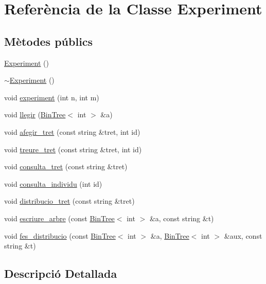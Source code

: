 \hypertarget{class_experiment}{}\section{Referència de la Classe Experiment}
\label{class_experiment}
\subsection*{Mètodes públics}
\begin{DoxyCompactItemize}
\item 
\hyperlink{class_experiment_a303e6a05d99f403ff4793495a2fbff58}{Experiment} ()
\item 
\hyperlink{class_experiment_a96058d848040e45948bbb60623711da6}{$\sim$\+Experiment} ()
\item 
void \hyperlink{class_experiment_a63c86bd1da616ca6e6a1062927365c20}{experiment} (int n, int m)
\item 
void \hyperlink{class_experiment_a54749c1c7a945548ec6e899222b03f98}{llegir} (\hyperlink{class_bin_tree}{Bin\+Tree}$<$ int $>$ \&a)
\item 
void \hyperlink{class_experiment_a66622c82700376f3aa3f6695650a63fe}{afegir\+\_\+tret} (const string \&tret, int id)
\item 
void \hyperlink{class_experiment_ae7583702f52c16814423b9b192a11ec4}{treure\+\_\+tret} (const string \&tret, int id)
\item 
void \hyperlink{class_experiment_a2fe4b1ba2ba6de100f2df9527f86d3cc}{consulta\+\_\+tret} (const string \&tret)
\item 
void \hyperlink{class_experiment_a35e678379748ccd822a1607e98666477}{consulta\+\_\+individu} (int id)
\item 
void \hyperlink{class_experiment_a2373a3c88ea98ae7c97bc0a8f84a67ad}{distribucio\+\_\+tret} (const string \&tret)
\item 
void \hyperlink{class_experiment_a939a57f49d9c84beac5fd31a729fb486}{escriure\+\_\+arbre} (const \hyperlink{class_bin_tree}{Bin\+Tree}$<$ int $>$ \&a, const string \&t)
\item 
void \hyperlink{class_experiment_aa2dc89ba273375bf829014ead8d44898}{fes\+\_\+distribucio} (const \hyperlink{class_bin_tree}{Bin\+Tree}$<$ int $>$ \&a, \hyperlink{class_bin_tree}{Bin\+Tree}$<$ int $>$ \&aux, const string \&t)
\end{DoxyCompactItemize}


\subsection{Descripció Detallada}



